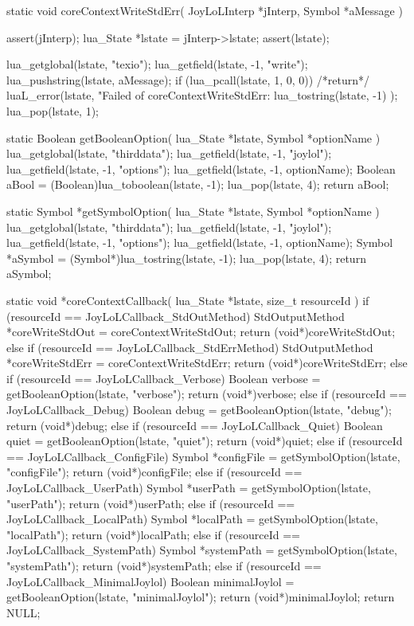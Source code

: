 static void coreContextWriteStdErr(
  JoyLoLInterp *jInterp,
  Symbol       *aMessage
) {
  assert(jInterp);
  lua_State *lstate = jInterp->lstate;
  assert(lstate);
  
  lua_getglobal(lstate, "texio");
  lua_getfield(lstate, -1, "write");
  lua_pushstring(lstate, aMessage);
  if (lua_pcall(lstate, 1, 0, 0)) {
    /*return*/ luaL_error(lstate,
      "Failed of coreContextWriteStdErr\nERROR:\n%
      lua_tostring(lstate, -1)
    );
  }
  lua_pop(lstate, 1);
}

static Boolean getBooleanOption(
  lua_State *lstate, 
  Symbol    *optionName
) {
  lua_getglobal(lstate, "thirddata");
  lua_getfield(lstate, -1, "joylol");
  lua_getfield(lstate, -1, "options");
  lua_getfield(lstate, -1, optionName);
  Boolean aBool = (Boolean)lua_toboolean(lstate, -1);
  lua_pop(lstate, 4);
  return aBool;
}

static Symbol *getSymbolOption(
  lua_State *lstate,
  Symbol    *optionName
) {
  lua_getglobal(lstate, "thirddata");
  lua_getfield(lstate, -1, "joylol");
  lua_getfield(lstate, -1, "options");
  lua_getfield(lstate, -1, optionName);
  Symbol *aSymbol = (Symbol*)lua_tostring(lstate, -1);
  lua_pop(lstate, 4);
  return aSymbol;
}

static void *coreContextCallback(
  lua_State *lstate,
  size_t resourceId
) {
  if (resourceId == JoyLoLCallback_StdOutMethod) {
    StdOutputMethod *coreWriteStdOut =
      coreContextWriteStdOut;
    return (void*)coreWriteStdOut;
  } else if (resourceId == JoyLoLCallback_StdErrMethod) {
    StdOutputMethod *coreWriteStdErr =
      coreContextWriteStdErr;
    return (void*)coreWriteStdErr;
  } else if (resourceId == JoyLoLCallback_Verbose) {
    Boolean verbose = getBooleanOption(lstate, "verbose");
    return (void*)verbose;
  } else if (resourceId == JoyLoLCallback_Debug) {
    Boolean debug = getBooleanOption(lstate, "debug");
    return (void*)debug;
  } else if (resourceId == JoyLoLCallback_Quiet) {
    Boolean quiet = getBooleanOption(lstate, "quiet");
    return (void*)quiet;
  } else if (resourceId == JoyLoLCallback_ConfigFile) {
    Symbol *configFile = getSymbolOption(lstate, "configFile");
    return (void*)configFile;
  } else if (resourceId == JoyLoLCallback_UserPath) {
    Symbol *userPath = getSymbolOption(lstate, "userPath");
    return (void*)userPath;
  } else if (resourceId == JoyLoLCallback_LocalPath) {
    Symbol *localPath = getSymbolOption(lstate, "localPath");
    return (void*)localPath;
  } else if (resourceId == JoyLoLCallback_SystemPath) {
    Symbol *systemPath = getSymbolOption(lstate, "systemPath");
    return (void*)systemPath;
  } else if (resourceId == JoyLoLCallback_MinimalJoylol) {
    Boolean minimalJoylol = getBooleanOption(lstate, "minimalJoylol");
    return (void*)minimalJoylol;
  }
  return NULL;
}
\stopCCode

